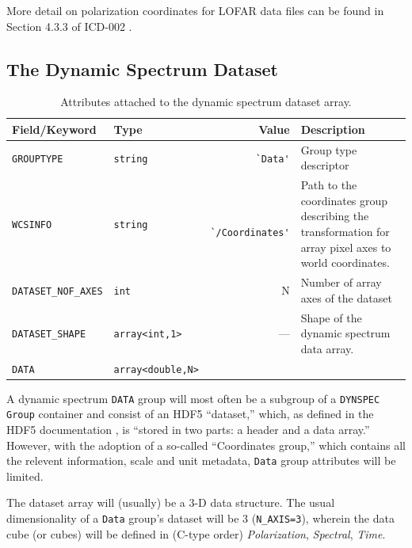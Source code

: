 \documentclass[a4paper,10pt,bibtotoc]{scrartcl}
\begin{document}
More detail on polarization coordinates for LOFAR data files can be found in 
Section 4.3.3 of ICD-002 \cite{lofar.icd.002}. 


\subsection{The Dynamic Spectrum Dataset}
\label{sec:dynspec dataset}

\begin{table}[htbp]
  \centering
  \begin{tabular}{|llrp{6cm}|}
    \hline
    \sc Field/Keyword & \sc Type & \sc Value & \sc Description \\
    \hline \hline
    \small\verb|GROUPTYPE| & \texttt{string} &\verb| `Data'|& Group type descriptor \\
    \small\verb|WCSINFO| & \texttt{string} &\verb| `/Coordinates'| & Path to the coordinates group describing the transformation for array pixel axes to world coordinates. \\
    \small{\verb|DATASET_NOF_AXES|} & \verb|int| & N & Number of array axes of the dataset \\
    \small{\verb|DATASET_SHAPE|} & \verb|array<int,1>| & --- &
    Shape of the dynamic spectrum data array. \\
    \hline
    \small{\verb|DATA|} & \verb|array<double,N>| &  & \\
    \hline
  \end{tabular}
  \caption{Attributes attached to the dynamic spectrum dataset array.}
  \label{tab:image dataset}
\end{table}


A dynamic spectrum \texttt{DATA} group will most often be a subgroup
of a \texttt{DYNSPEC Group} container and consist of an HDF5
``dataset,'' which, as defined in the HDF5 documentation
\cite{hdf5,hdf5.ug}, is ``stored in two parts: a header and a data
array.''  However, with the adoption of a so-called ``Coordinates
group,'' which contains all the relevent information, scale and unit
metadata, \texttt{Data} group attributes will be limited.

The dataset array will (usually) be a 3-D data structure.
The usual dimensionality of a
\texttt{Data} group's dataset will be 3 (\texttt{N\_AXIS=3}), wherein the data
cube (or cubes) will be defined in (C-type order) \textit{Polarization},
\textit{Spectral}, \textit{Time}.
\end{document}
